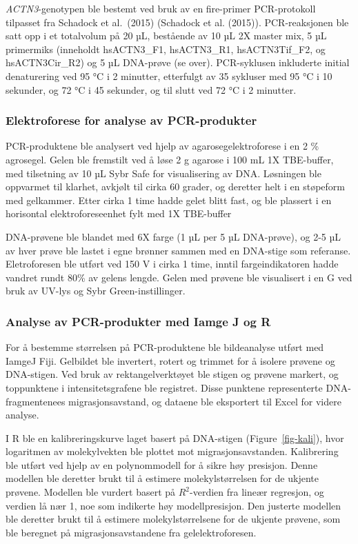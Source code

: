 \documentclass[
  letterpaper,
  DIV=11,
  numbers=noendperiod]{scrreprt}
\begin{document}
\emph{ACTN3}-genotypen ble bestemt ved bruk av en fire-primer
PCR-protokoll tilpasset fra Schadock et al.~(2015) (Schadock et al.
(2015)). PCR-reaksjonen ble satt opp i et totalvolum på 20 µL, bestående
av 10 µL 2X master mix, 5 µL primermiks (inneholdt hsACTN3\_F1,
hsACTN3\_R1, hsACTN3Tif\_F2, og hsACTN3Cir\_R2) og 5 µL DNA-prøve (se
over). PCR-syklusen inkluderte initial denaturering ved 95 °C i 2
minutter, etterfulgt av 35 sykluser med 95 °C i 10 sekunder, og 72 °C i
45 sekunder, og til slutt ved 72 °C i 2 minutter.

\subsubsection{Elektroforese for analyse av
PCR-produkter}\label{elektroforese-for-analyse-av-pcr-produkter}

PCR-produktene ble analysert ved hjelp av agarosegelektroforese i en 2
\% agrosegel. Gelen ble fremstilt ved å løse 2 g agarose i 100 mL 1X
TBE-buffer, med tilsetning av 10 µL Sybr Safe for visualisering av DNA.
Løsningen ble oppvarmet til klarhet, avkjølt til cirka 60 grader, og
deretter helt i en støpeform med gelkammer. Etter cirka 1 time hadde
gelet blitt fast, og ble plassert i en horisontal elektroforeseenhet
fylt med 1X TBE-buffer

DNA-prøvene ble blandet med 6X farge (1 µL per 5 µL DNA-prøve), og 2-5
µL av hver prøve ble lastet i egne brønner sammen med en DNA-stige som
referanse. Eletroforesen ble utført ved 150 V i cirka 1 time, inntil
fargeindikatoren hadde vandret rundt 80\% av gelens lengde. Gelen med
prøvene ble visualisert i en G ved bruk av UV-lys og Sybr
Green-instillinger.

\subsubsection{Analyse av PCR-produkter med Iamge J og
R}\label{analyse-av-pcr-produkter-med-iamge-j-og-r}

For å bestemme størrelsen på PCR-produktene ble bildeanalyse utført med
IamgeJ Fiji. Gelbildet ble invertert, rotert og trimmet for å isolere
prøvene og DNA-stigen. Ved bruk av rektangelverktøyet ble stigen og
prøvene markert, og toppunktene i intensitetsgrafene ble registret.
Disse punktene representerte DNA-fragmentenees migrasjonsavstand, og
dataene ble eksportert til Excel for videre analyse.

I R ble en kalibreringskurve laget basert på DNA-stigen
(Figure~\ref{fig-kali}), hvor logaritmen av molekylvekten ble plottet
mot migrasjonsavstanden. Kalibrering ble utført ved hjelp av en
polynommodell for å sikre høy presisjon. Denne modellen ble deretter
brukt til å estimere molekylstørrelsen for de ukjente prøvene. Modellen
ble vurdert basert på \(R^2\)-verdien fra lineær regresjon, og verdien
lå nær 1, noe som indikerte høy modellpresisjon. Den justerte modellen
ble deretter brukt til å estimere molekylstørrelsene for de ukjente
prøvene, som ble beregnet på migrasjonsavstandene fra gelelektroforesen.
\end{document}
